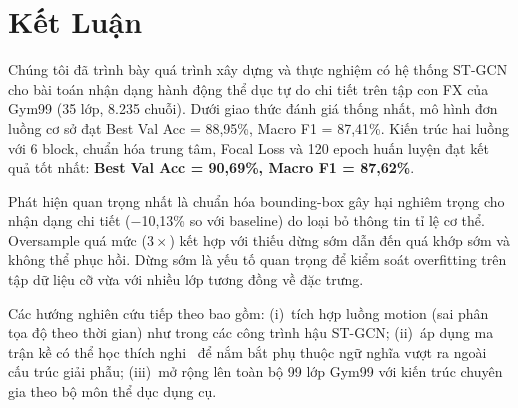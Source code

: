 \documentclass[conference]{IEEEtran}
\begin{document}
\section{Kết Luận}
\label{sec:conclusion}

Chúng tôi đã trình bày quá trình xây dựng và thực nghiệm có hệ thống
ST-GCN cho bài toán nhận dạng hành động thể dục tự do chi tiết trên tập
con FX của Gym99 (35 lớp, 8.235 chuỗi). Dưới giao thức đánh giá thống
nhất, mô hình đơn luồng cơ sở đạt Best Val Acc = 88,95\%, Macro F1 =
87,41\%. Kiến trúc hai luồng với 6 block, chuẩn hóa trung tâm, Focal
Loss và 120 epoch huấn luyện đạt kết quả tốt nhất:
\textbf{Best Val Acc = 90,69\%, Macro F1 = 87,62\%}.

Phát hiện quan trọng nhất là chuẩn hóa bounding-box gây hại nghiêm
trọng cho nhận dạng chi tiết ($-$10,13\% so với baseline) do loại bỏ
thông tin tỉ lệ cơ thể. Oversample quá mức ($3\times$) kết hợp với
thiếu dừng sớm dẫn đến quá khớp sớm và không thể phục hồi. Dừng sớm
là yếu tố quan trọng để kiểm soát overfitting trên tập dữ liệu cỡ vừa
với nhiều lớp tương đồng về đặc trưng.

Các hướng nghiên cứu tiếp theo bao gồm: (i)~tích hợp luồng motion (sai
phân tọa độ theo thời gian) như trong các công trình hậu ST-GCN;
(ii)~áp dụng ma trận kề có thể học thích nghi~\cite{shi2019agcn} để
nắm bắt phụ thuộc ngữ nghĩa vượt ra ngoài cấu trúc giải phẫu;
(iii)~mở rộng lên toàn bộ 99 lớp Gym99 với kiến trúc chuyên gia theo
bộ môn thể dục dụng cụ.
\end{document}
